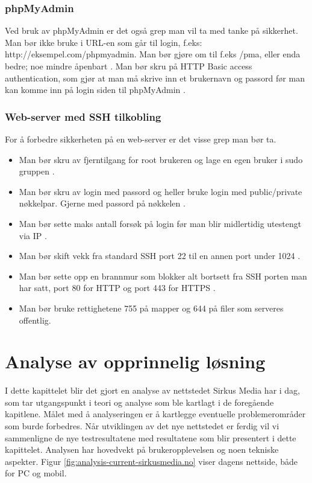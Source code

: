 \subsubsection{phpMyAdmin}
\label{sec:analysis-security-phpmyadmin}
Ved bruk av phpMyAdmin er det også grep man vil ta med tanke på sikkerhet. Man bør ikke bruke  i URL-en som går til login, f.eks: http://eksempel.com/phpmyadmin. Man bør gjøre om til f.eks /pma, eller enda bedre; noe mindre åpenbart \cite{canepa2016}.
Man bør skru på HTTP Basic access authentication, som gjør at man må skrive inn et brukernavn og passord før man kan komme inn på login siden til phpMyAdmin \cite{drake_2018}.

\subsubsection{Web-server med SSH tilkobling}
\label{sec:analysis-security-web-server-ssh}
For å forbedre sikkerheten på en web-server er det visse grep man bør ta.
\begin{itemize}
\item Man bør skru av fjerntilgang for root brukeren og lage en egen bruker i sudo gruppen \cite{ellingwood_2014}.
\item Man bør skru av login med passord \cite{jetha2018} og heller bruke login med public/private nøkkelpar. Gjerne med passord på nøkkelen \cite{jetha2018}.
\item Man bør sette maks antall forsøk på login før man blir midlertidig utestengt via IP \cite{ellingwood_2014_2}.
\item Man bør skift vekk fra standard SSH port 22 \cite{miessler2019} til en annen port under 1024 \cite{w3cports1995}.
\item Man bør sette opp en brannmur som blokker alt bortsett fra SSH porten man har satt, port 80 for HTTP og port 443 for HTTPS \cite{virdo2016}.
\item Man bør bruke rettighetene 755 på mapper og 644 på filer som serveres offentlig. \cite[s.~34]{barnettapache}
\end{itemize}

\section{Analyse av opprinnelig løsning}

I dette kapittelet blir det gjort en analyse av nettstedet Sirkus Media har i dag, som tar utgangspunkt i teori og analyse som ble kartlagt i de foregående kapitlene. Målet med å analyseringen er å kartlegge eventuelle problemerområder som burde forbedres. Når utviklingen av det nye nettstedet er ferdig vil vi sammenligne de nye testresultatene med resultatene som blir presentert i dette kapittelet. Analysen har hovedvekt på brukeropplevelsen og noen tekniske aspekter.
Figur \ref{fig:analysis-current-sirkusmedia.no} viser dagens nettside, både for PC og mobil.

